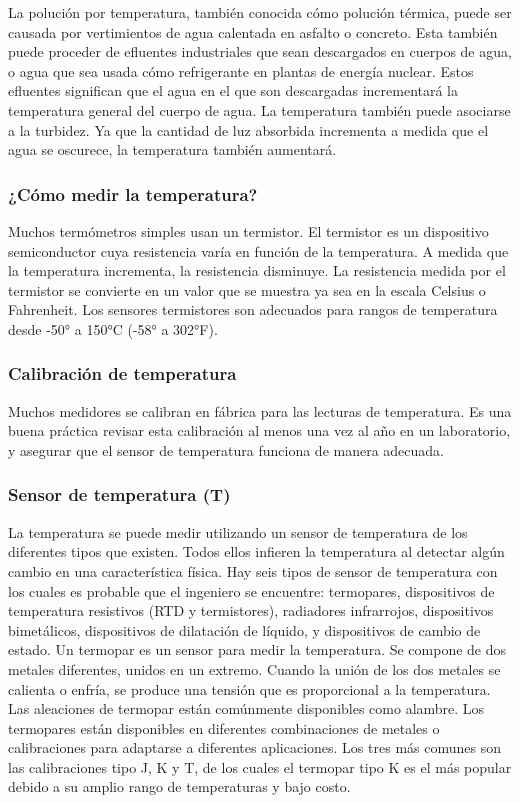 La polución por temperatura, también conocida cómo polución térmica, puede ser causada por vertimientos de agua calentada en asfalto o concreto. 
Esta también puede proceder de efluentes industriales que sean descargados en cuerpos de agua, o agua que sea usada cómo refrigerante en plantas de energía nuclear. 
Estos efluentes significan que el agua en el que son descargadas incrementará la temperatura general del cuerpo de agua.  
La temperatura también puede asociarse a la turbidez.  
Ya que la cantidad de luz absorbida incrementa a medida que el agua se oscurece, la temperatura también aumentará.

\subsubsection{¿Cómo medir la temperatura?}
Muchos termómetros simples usan un termistor.  
El termistor es un dispositivo semiconductor cuya resistencia varía en función de la temperatura.  
A medida que la temperatura incrementa, la resistencia disminuye.  
La resistencia medida por el termistor se convierte en un valor que se muestra ya sea en la escala Celsius o Fahrenheit.  
Los sensores termistores son adecuados para rangos de temperatura desde -50° a 150°C (-58° a 302°F).

\subsubsection{Calibración de temperatura}
Muchos medidores se calibran en fábrica para las lecturas de temperatura. 
Es una buena práctica revisar esta calibración al menos una vez al año en un laboratorio, y asegurar que el sensor de temperatura funciona de manera adecuada.

\subsubsection{Sensor de temperatura (T)}
La temperatura se puede medir utilizando un sensor de temperatura de los diferentes tipos que existen. 
Todos ellos infieren la temperatura al detectar algún cambio en una característica física. 
Hay seis tipos de sensor de temperatura con los cuales es probable que el ingeniero se encuentre: termopares, dispositivos de temperatura resistivos (RTD y termistores), radiadores infrarrojos, dispositivos bimetálicos, dispositivos de dilatación de l\'iquido, y dispositivos de cambio de estado.
Un termopar es un sensor para medir la temperatura. 
Se compone de dos metales diferentes, unidos en un extremo. Cuando la unión de los dos metales se calienta o enfría, se produce una tensión que es proporcional a la temperatura. 
Las aleaciones de termopar están comúnmente disponibles como alambre.
Los termopares están disponibles en diferentes combinaciones de metales o calibraciones para adaptarse a diferentes aplicaciones. 
Los tres más comunes son las calibraciones tipo J, K y T, de los cuales el termopar tipo K es el más popular debido a su amplio rango de temperaturas y bajo costo.

